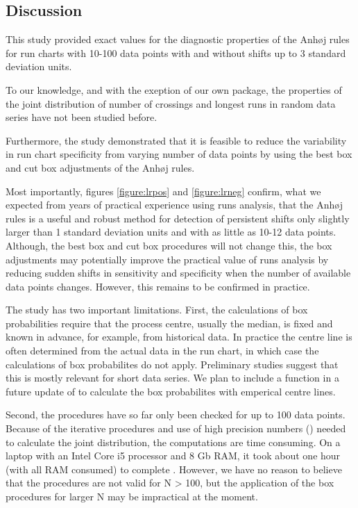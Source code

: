 \hypertarget{discussion}{%
\subsection{Discussion}\label{discussion}}

This study provided exact values for the diagnostic properties of the
Anhøj rules for run charts with 10-100 data points with and without
shifts up to 3 standard deviation units.

To our knowledge, and with the exeption of our own 
package, the properties of the joint distribution of number of crossings
and longest runs in random data series have not been studied before.

Furthermore, the study demonstrated that it is feasible to reduce the
variability in run chart specificity from varying number of data points
by using the best box and cut box adjustments of the Anhøj rules.

Most importantly, figures \ref{figure:lrpos} and \ref{figure:lrneg}
confirm, what we expected from years of practical experience using runs
analysis, that the Anhøj rules is a useful and robust method for
detection of persistent shifts only slightly larger than 1 standard
deviation units and with as little as 10-12 data points. Although, the
best box and cut box procedures will not change this, the box
adjustments may potentially improve the practical value of runs analysis
by reducing sudden shifts in sensitivity and specificity when the number
of available data points changes. However, this remains to be confirmed
in practice.

The study has two important limitations. First, the calculations of box
probabilities require that the process centre, usually the median, is
fixed and known in advance, for example, from historical data. In
practice the centre line is often determined from the actual data in the
run chart, in which case the calculations of box probabilites do not
apply. Preliminary studies suggest that this is mostly relevant for
short data series. We plan to include a function in a future update of
 to calculate the box probabilites with emperical
centre lines.

Second, the procedures have so far only been checked for up to 100 data
points. Because of the iterative procedures and use of high precision
numbers () needed to calculate the joint distribution,
the computations are time consuming. On a laptop with an Intel Core i5
processor and 8 Gb RAM, it took about one hour (with all RAM consumed)
to complete . However, we have no reason to believe
that the procedures are not valid for N \textgreater{} 100, but the
application of the box procedures for larger N may be impractical at the
moment.


